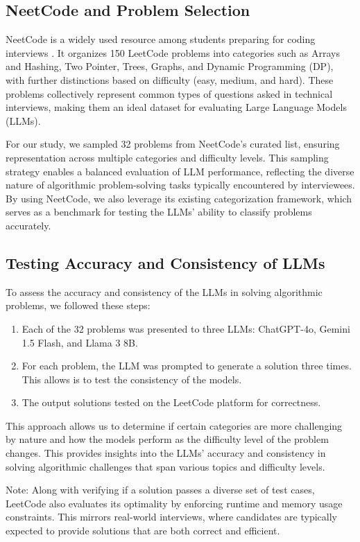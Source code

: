 \documentclass[times, 10pt,twocolumn]{article}
\begin{document}
\subsection{NeetCode and Problem Selection}
NeetCode is a widely used resource among students preparing for coding interviews \cite{neetcode}. It organizes 150 LeetCode problems into categories such as Arrays and Hashing, Two Pointer, Trees, Graphs, and Dynamic Programming (DP), with further distinctions based on difficulty (easy, medium, and hard). These problems collectively represent common types of questions asked in technical interviews, making them an ideal dataset for evaluating Large Language Models (LLMs).

For our study, we sampled 32 problems from NeetCode's curated list, ensuring representation across multiple categories and difficulty levels. This sampling strategy enables a balanced evaluation of LLM performance, reflecting the diverse nature of algorithmic problem-solving tasks typically encountered by interviewees. By using NeetCode, we also leverage its existing categorization framework, which serves as a benchmark for testing the LLMs' ability to classify problems accurately.

\subsection{Testing Accuracy and Consistency of LLMs}
To assess the accuracy and consistency of the LLMs in solving algorithmic problems, we followed these steps:

\begin{enumerate}
    \item Each of the 32 problems was presented to three LLMs: ChatGPT-4o, Gemini 1.5 Flash, and Llama 3 8B.
    \item For each problem, the LLM was prompted to generate a solution three times. This allows is to test the consistency of the models.
    \item The output solutions tested on the LeetCode platform for correctness.
\end{enumerate}

This approach allows us to determine if certain categories are more challenging by nature and how the models perform as the difficulty level of the problem changes. This provides insights into the LLMs' accuracy and consistency in solving algorithmic challenges that span various topics and difficulty levels.

Note: Along with verifying if a solution passes a diverse set of test cases, LeetCode also evaluates its optimality by enforcing runtime and memory usage constraints. This mirrors real-world interviews, where candidates are typically expected to provide solutions that are both correct and efficient.
\end{document}
